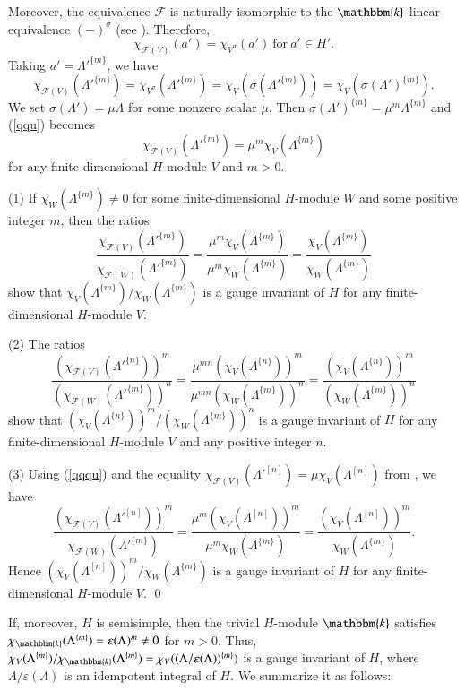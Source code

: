 \documentclass[11pt]{amsart}
\numberwithin{equation}{section}
\begin{document}
Moreover, the equivalence  $\mathcal{F}$ is naturally isomorphic to the $\mathbbm{k}$-linear equivalence $(-)^\sigma$ (see \cite[Theorem 1.1]{KMN}).
Therefore, $$\chi_{\mathcal{F}(V)}(a')=\chi_{V^{\sigma}}(a')\ \text{for}\ a'\in H'.$$
Taking $a'=\Lambda'^{\{m\}}$, we have
\begin{equation}\label{qqu}\chi_{\mathcal{F}(V)}(\Lambda'^{\{m\}})=\chi_{V^{\sigma}}(\Lambda'^{\{m\}})=\chi_{V}(\sigma(\Lambda'^{\{m\}}))=\chi_{V}(\sigma(\Lambda')^{\{m\}}).\end{equation}
We set $\sigma(\Lambda')=\mu\Lambda$ for some nonzero scalar $\mu$. Then $\sigma(\Lambda')^{\{m\}}=\mu^m \Lambda^{\{m\}}$ and (\ref{qqu}) becomes
\begin{equation}\label{qqqu}\chi_{\mathcal{F}(V)}(\Lambda'^{\{m\}})=\mu^m\chi_{V}(\Lambda^{\{m\}})\end{equation}for any finite-dimensional $H$-module $V$ and $m>0$.

(1)  If  $\chi_{W}(\Lambda^{\{m\}})\neq0$ for some finite-dimensional $H$-module $W$ and some positive integer $m$, then the ratios
$$\frac{\chi_{\mathcal{F}(V)}(\Lambda'^{\{m\}})}{\chi_{\mathcal{F}(W)}(\Lambda'^{\{m\}})}
=\frac{\mu^m\chi_{V}(\Lambda^{\{m\}})}{\mu^m\chi_{W}(\Lambda^{\{m\}})}=\frac{\chi_{V}(\Lambda^{\{m\}})}{\chi_{W}(\Lambda^{\{m\}})}$$
show that  $\chi_{V}(\Lambda^{\{m\}})/\chi_{W}(\Lambda^{\{m\}})$ is a gauge invariant of $H$ for any finite-dimensional $H$-module $V$.

(2) The ratios
$$\frac{(\chi_{\mathcal{F}(V)}(\Lambda'^{\{n\}}))^m}{(\chi_{\mathcal{F}(W)}(\Lambda'^{\{m\}}))^n}=\frac{\mu^{mn}(\chi_{V}(\Lambda^{\{n\}}))^m}{\mu^{mn}(\chi_{W}(\Lambda^{\{m\}}))^n}
=\frac{(\chi_{V}(\Lambda^{\{n\}}))^m}{(\chi_{W}(\Lambda^{\{m\}}))^n}
$$ show that $(\chi_{V}(\Lambda^{\{n\}}))^m/(\chi_{W}(\Lambda^{\{m\}}))^n$ is a gauge invariant of $H$ for any finite-dimensional $H$-module $V$ and any positive integer $n$.



(3) Using  (\ref{qqqu}) and the equality $\chi_{\mathcal{F}(V)}(\Lambda'^{[n]})=\mu\chi_{V}(\Lambda^{[n]})$ from \cite{W}, we have 
$$\frac{(\chi_{\mathcal{F}(V)}(\Lambda'^{[n]}))^m}{\chi_{\mathcal{F}(W)}(\Lambda'^{\{m\}})}
=\frac{\mu^m(\chi_{V}(\Lambda^{[n]}))^m}{\mu^m\chi_{W}(\Lambda^{\{m\}})}
=\frac{(\chi_{V}(\Lambda^{[n]}))^m}{\chi_{W}(\Lambda^{\{m\}})}.$$
Hence $(\chi_{V}(\Lambda^{[n]}))^m/\chi_{W}(\Lambda^{\{m\}})$ is a gauge invariant of $H$ for any finite-dimensional $H$-module $V$.
\qed

If, moreover,  $H$ is semisimple, then the trivial $H$-module $\mathbbm{k}$ satisfies $\chi_{\mathbbm{k}}(\Lambda^{\{m\}})=\varepsilon(\Lambda)^m\neq0$ for $m>0$. Thus, $\chi_{V}(\Lambda^{\{m\}})/\chi_{\mathbbm{k}}(\Lambda^{\{m\}})=\chi_{V}((\Lambda/\varepsilon(\Lambda))^{\{m\}})$ is a gauge invariant of $H$, where $\Lambda/\varepsilon(\Lambda)$ is an idempotent integral of $H$. We summarize it as follows:  
\end{document}
